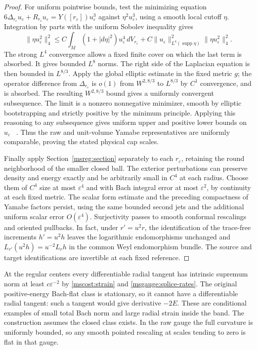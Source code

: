 \documentclass[11pt]{article}
\numberwithin{equation}{section}
\theoremstyle{definition}
\theoremstyle{remark}
\begin{document}
\begin{proof}
For uniform pointwise bounds, test the minimizing equation
\(6\Delta_{r_\varepsilon}u_\varepsilon+
R_{r_\varepsilon}u_\varepsilon=Y([r_\varepsilon])u_\varepsilon^3\)
against \(\eta^2u_\varepsilon^3\), using a smooth local cutoff
\(\eta\). Integration by parts with the uniform Sobolev
inequality gives
\[
 \|\eta u_\varepsilon^2\|_4^2
 \le C\int_M (1+|d\eta|^2)u_\varepsilon^4\,dV_{r_\varepsilon}
     + C\|u_\varepsilon\|_{L^4(\operatorname{supp}\eta)}^2
             \|\eta u_\varepsilon^2\|_4^2 .
\]
The strong \(L^4\) convergence allows a fixed finite cover on
which the last term is absorbed. It gives bounded \(L^8\) norms.
The right side of the Laplacian equation is then bounded in
\(L^{8/3}\). Apply the global elliptic estimate in the fixed
metric \(g\); the operator difference from
\(\Delta_{r_\varepsilon}\) is \(o(1)\) from \(W^{2,8/3}\) to
\(L^{8/3}\) by \(C^1\) convergence, and is absorbed. The resulting
\(W^{2,8/3}\) bound gives a uniformly convergent subsequence.
The limit is a nonzero nonnegative minimizer, smooth by
elliptic bootstrapping and strictly positive by the minimum
principle. Applying this reasoning to any subsequence gives
uniform upper and positive lower bounds on \(u_\varepsilon\)%
~\cite[\S2, Theorems 2.2 and 2.5--2.6]{LeeParker1987Yamabe}.
Thus the raw and unit-volume Yamabe representatives are uniformly
comparable, proving the stated physical cap scales.

Finally apply Section~\ref{msreg:section} separately to each
\(r_\varepsilon\), retaining the round neighborhood of the
smaller closed ball. The exterior perturbations can preserve
density and energy exactly and be arbitrarily small in \(C^4\)
at each radius. Choose them of \(C^4\) size at most
\(\varepsilon^4\) and with Bach integral error at most
\(\varepsilon^2\), by continuity at each fixed metric. The scalar
form estimate and the preceding compactness of Yamabe factors
persist, using the same bounded second jets and the additional
uniform scalar error \(O(\varepsilon^4)\). Surjectivity passes to
smooth conformal rescalings and oriented pullbacks. In fact,
under \(r'=u^2r\), the identification of the trace-free increments
\(h'=u^2h\) leaves the logarithmic endomorphisms unchanged and
\(L_{r'}(u^2h)=u^{-2}L_rh\) in the common Weyl endomorphism bundle.
The source and target identifications are invertible at each
fixed reference.
\end{proof}

At the regular centers every differentiable radial tangent has
intrinsic supremum norm at least \(c\varepsilon^{-2}\) by
\eqref{mscost:strain} and \eqref{msgauge:splice-rates}. The
original positive-energy Bach-flat class is stationary, so it
cannot have a differentiable radial tangent: such a tangent
would give derivative \(-2E\). These are conditional
examples of small total Bach norm and large radial strain
inside the band. The construction assumes the closed class
exists. In the raw gauge the full curvature is uniformly bounded,
so any smooth pointed rescaling at scales tending to zero is flat
in that gauge.
\end{document}
